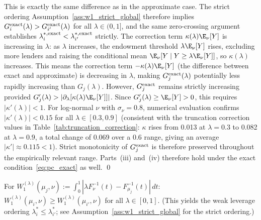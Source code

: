 \begin{remark}
This is exactly the same difference as in the approximate case. The strict ordering Assumption~\ref{ass:w1_strict_global} therefore implies $G_i^{\rm exact}(\lambda) > G_{i'}^{\rm exact}(\lambda)$ for all $\lambda \in (0,1]$, and the same zero-crossing argument establishes $\lambda_i^{*,\rm exact} < \lambda_{i'}^{*,\rm exact}$ strictly. The correction term $\kappa(\lambda)\E_\nu[Y]$ is increasing in $\lambda$: as $\lambda$ increases, the endowment threshold $\lambda\E_\nu[Y]$ rises, excluding more lenders and raising the conditional mean $\E_\nu[Y \mid Y \geq \lambda\E_\nu[Y]]$, so $\kappa(\lambda)$ increases. This means the correction term $-\kappa(\lambda)\E_\nu[Y]$ (the difference between exact and approximate) is decreasing in $\lambda$, making $G_j^{\rm exact}(\lambda)$ potentially less rapidly increasing than $G_j(\lambda)$. However, $G_j^{\rm exact}$ remains strictly increasing provided $G_j'(\lambda) > |\partial_\lambda[\kappa(\lambda)\E_\nu[Y]]|$. Since $G_j'(\lambda) \geq \E_\nu[Y] > 0$, this requires $|\kappa'(\lambda)| < 1$. For log-normal $\nu$ with $\sigma_\nu = 0.8$, numerical evaluation confirms $|\kappa'(\lambda)| < 0.15$ for all $\lambda \in [0.3, 0.9]$ (consistent with the truncation correction values in Table~\ref{tab:truncation_correction}: $\kappa$ rises from 0.013 at $\lambda=0.3$ to 0.082 at $\lambda=0.9$, a total change of 0.069 over a 0.6 range, giving an average $|\kappa'| \approx 0.115 < 1$). Strict monotonicity of $G_j^{\rm exact}$ is therefore preserved throughout the empirically relevant range. Parts~(iii) and~(iv) therefore hold under the exact condition~\eqref{eq:pc_exact} as well. \qed
\end{remark}

\begin{assumption}
\label{ass:w1_monotone}
For $W_1^{(\lambda)}(\mu_j,\nu) := \int_0^1|\lambda F_\nu^{-1}(t) - F_{\mu_j}^{-1}(t)|\,dt$: $W_1^{(\lambda)}(\mu_i,\nu) \geq W_1^{(\lambda)}(\mu_{i'},\nu)$ for all $\lambda \in [0,1]$. (This yields the weak leverage ordering $\lambda_i^* \leq \lambda_{i'}^*$; see Assumption~\ref{ass:w1_strict_global} for the strict ordering.)
\end{assumption}

